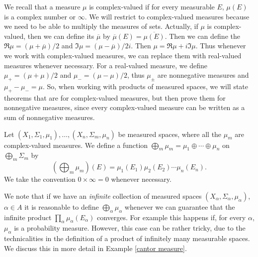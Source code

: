We recall that a measure $\mu$ is complex-valued if for every measurable $E$, $\mu(E)$ is a complex number or $\infty$.
We will restrict to complex-valued measures because we need to be able to multiply the measures of sets.
Actually, if $\mu$ is complex-valued, then we can define its  $\overline \mu$ by $\overline \mu(E) = \overline{\mu(E)}$.
Then we can define the  $\Re \mu = (\mu + \overline \mu)/2$ and  $\Im \mu = (\mu - \overline \mu)/2i$.
Then $\mu = \Re \mu + i\Im \mu$.
Thus whenever we work with complex-valued measures, we can replace them with real-valued measures whenever necessary.
For a real-valued measure, we define $\mu_+ = (\mu + \mu)/2$ and $\mu_- = (\mu - \mu)/2$, thus $\mu_\pm$ are nonnegative measures and $\mu_+ - \mu_- = \mu$.
So, when working with products of measured spaces, we will state theorems that are for complex-valued measures, but then prove them for nonnegative measures, since every complex-valued measure can be written as a sum of nonnegative measures.

\begin{definition}
Let $(X_1, \Sigma_1, \mu_1), \dots, (X_n, \Sigma_m, \mu_n)$ be measured spaces, where all the $\mu_m$ are complex-valued measures.
We define a function $\bigoplus_m \mu_m = \mu_1 \oplus \cdots \oplus \mu_n$ on $\bigoplus_m \Sigma_m$ by
$$\left(\bigoplus_m \mu_m\right)(E) = \mu_1(E_1)\mu_2(E_2) \cdots \mu_n(E_n).$$
We take the convention $0 \times \infty = 0$ whenever necessary.
\end{definition}

We note that if we have an \emph{infinite} collection of measured spaces $(X_\alpha, \Sigma_\alpha, \mu_\alpha)$, $\alpha \in A$ it is reasonable to define $\bigoplus_\alpha \mu_\alpha$ whenever we can guarantee that the infinite product $\prod_\alpha \mu_\alpha(E_\alpha)$ converges.
For example this happens if, for every $\alpha$, $\mu_\alpha$ is a probability measure.
However, this case can be rather tricky, due to the technicalities in the definition of a product of infinitely many measurable spaces.
We discuss this in more detail in Example \ref{cantor measure}.


